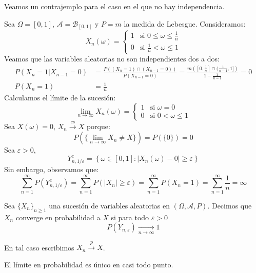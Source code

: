 \begin{example}
    Veamos un contrajemplo para el caso en el que no hay independencia.

    Sea $\Omega = [0, 1]$, $\mathcal{A} = \mathcal{B}_{[0, 1]}$ y $P = m$ la medida de Lebesgue.
    Consideramos:
    $$X_n(\omega) = \begin{cases}
            1 & \text{si } 0 \leq \omega \leq \frac{1}{n} \\
            0 & \text{si } \frac{1}{n} < \omega \leq 1
        \end{cases}$$
    Veamos que las variables aleatorias no son independientes dos a dos:
    \begin{align*}
        P(X_n = 1 | X_{n-1} = 0) & = \frac{P((X_n = 1) \cap (X_{n-1} = 0))}{P(X_{n-1} = 0)} = \frac{m\left([0, \frac{1}{n}] \cap (\frac{1}{n-1}, 1]\right)}{1 - \frac{1}{n-1}} = 0 \\
        P(X_n = 1)               & = \frac{1}{n}
    \end{align*}
    Calculamos el límite de la sucesión:
    $$\lim\limits_{n \to \infty} X_n(\omega) = \begin{cases}
            1 & \text{si } \omega = 0        \\
            0 & \text{si } 0 < \omega \leq 1
        \end{cases}$$
    Sea $X(\omega) = 0$, $X_n \xrightarrow{cs} X$ porque:
    $$P(\{\lim\limits_{n \to \infty} X_n \neq X\}) = P(\{0\}) = 0$$
    Sea $\varepsilon > 0$,
    $$Y_{n, 1/\varepsilon}^c = \left\{ \omega \in [0, 1] : |X_n(\omega) - 0| \geq \varepsilon \right\}$$
    Sin embargo, observamos que:
    $$\sum_{n=1}^\infty P(Y_{n, 1/\varepsilon}^c) = \sum_{n=1}^\infty P(|X_n| \geq \varepsilon) = \sum_{n=1}^\infty P(X_n = 1) = \sum_{n=1}^\infty \frac{1}{n} = \infty$$
\end{example}

\begin{definition}
    Sea $\{X_n\}_{n \geq 1}$ una sucesión de variables aleatorias en $(\Omega, \mathcal{A}, P)$.
    Decimos que $X_n$ converge en probabilidad a $X$ si para todo $\varepsilon > 0$
    $$P(Y_{n, \varepsilon}) \xrightarrow[n \to \infty]{} 1$$

    En tal caso escribimos $X_n \xrightarrow{p} X$.
\end{definition}

\begin{theorem}
    El límite en probabilidad es único en casi todo punto.
\end{theorem}


